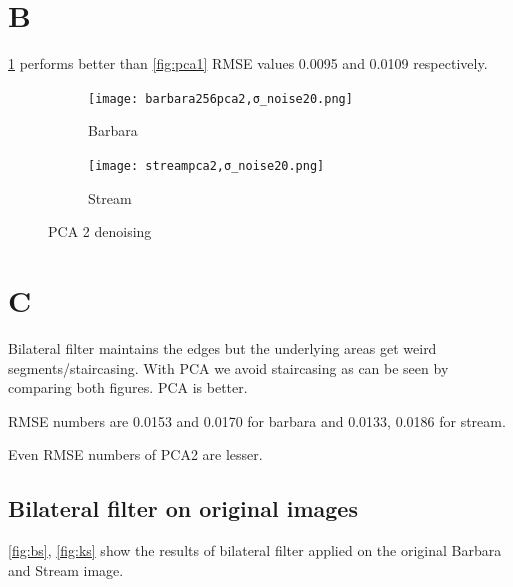 \documentclass[a4paper, landscape]{article}
\begin{document}
\section{B}
\ref{fig:pca2} performs better than \ref{fig:pca1}
RMSE values 0.0095 and  0.0109 respectively.
\begin{figure}
    \centering
    \begin{subfigure}{0.48\linewidth}
        \centering
        \texttt{[image: barbara256pca2,σ\_noise20.png]}
        \caption{Barbara}
    \end{subfigure}
    \begin{subfigure}{0.48\linewidth}
        \centering
        \texttt{[image: streampca2,σ\_noise20.png]}
        \caption{Stream}
    \end{subfigure}
    \caption{PCA 2 denoising}
    \label{fig:pca2}
\end{figure}
\section{C}
Bilateral filter maintains the edges but the underlying areas get weird segments/staircasing. With PCA we avoid staircasing as can be seen by comparing both figures. PCA is better.

RMSE numbers are 0.0153 and 0.0170 for barbara and 0.0133, 0.0186 for stream.

Even RMSE numbers of PCA2 are lesser.
\subsection{Bilateral filter on original images}{\label{sec:bfo}}
\ref{fig:bs}, \ref{fig:ks} show the results of bilateral filter applied on the original Barbara and Stream image.
\end{document}
